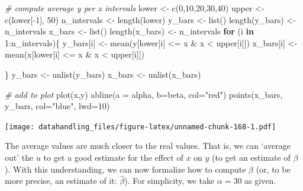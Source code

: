 \documentclass[
  12pt,
]{style/krantz}
\newenvironment{Shaded}{\begin{snugshade}}{\end{snugshade}}
\newcommand{\AttributeTok}[1]{\textcolor[rgb]{0.77,0.63,0.00}{#1}}
\newcommand{\CommentTok}[1]{\textcolor[rgb]{0.56,0.35,0.01}{\textit{#1}}}
\newcommand{\ControlFlowTok}[1]{\textcolor[rgb]{0.13,0.29,0.53}{\textbf{#1}}}
\newcommand{\DecValTok}[1]{\textcolor[rgb]{0.00,0.00,0.81}{#1}}
\newcommand{\FunctionTok}[1]{\textcolor[rgb]{0.00,0.00,0.00}{#1}}
\newcommand{\NormalTok}[1]{#1}
\newcommand{\OtherTok}[1]{\textcolor[rgb]{0.56,0.35,0.01}{#1}}
\newcommand{\SpecialCharTok}[1]{\textcolor[rgb]{0.00,0.00,0.00}{#1}}
\newcommand{\StringTok}[1]{\textcolor[rgb]{0.31,0.60,0.02}{#1}}
\begin{document}
\begin{Shaded}
\begin{Highlighting}[]
\CommentTok{\# compute average y per x intervals}
\NormalTok{lower }\OtherTok{\textless{}{-}} \FunctionTok{c}\NormalTok{(}\DecValTok{0}\NormalTok{,}\DecValTok{10}\NormalTok{,}\DecValTok{20}\NormalTok{,}\DecValTok{30}\NormalTok{,}\DecValTok{40}\NormalTok{)}
\NormalTok{upper }\OtherTok{\textless{}{-}} \FunctionTok{c}\NormalTok{(lower[}\SpecialCharTok{{-}}\DecValTok{1}\NormalTok{], }\DecValTok{50}\NormalTok{)}
\NormalTok{n\_intervals }\OtherTok{\textless{}{-}} \FunctionTok{length}\NormalTok{(lower)}
\NormalTok{y\_bars }\OtherTok{\textless{}{-}} \FunctionTok{list}\NormalTok{()}
\FunctionTok{length}\NormalTok{(y\_bars) }\OtherTok{\textless{}{-}}\NormalTok{ n\_intervals}
\NormalTok{x\_bars }\OtherTok{\textless{}{-}} \FunctionTok{list}\NormalTok{()}
\FunctionTok{length}\NormalTok{(x\_bars) }\OtherTok{\textless{}{-}}\NormalTok{ n\_intervals}
\ControlFlowTok{for}\NormalTok{ (i }\ControlFlowTok{in} \DecValTok{1}\SpecialCharTok{:}\NormalTok{n\_intervals)\{}
\NormalTok{  y\_bars[i] }\OtherTok{\textless{}{-}} \FunctionTok{mean}\NormalTok{(y[lower[i] }\SpecialCharTok{\textless{}=}\NormalTok{ x }\SpecialCharTok{\&}\NormalTok{ x }\SpecialCharTok{\textless{}}\NormalTok{ upper[i]])}
\NormalTok{  x\_bars[i] }\OtherTok{\textless{}{-}} \FunctionTok{mean}\NormalTok{(x[lower[i] }\SpecialCharTok{\textless{}=}\NormalTok{ x }\SpecialCharTok{\&}\NormalTok{ x }\SpecialCharTok{\textless{}}\NormalTok{ upper[i]])}

\NormalTok{\}}
\NormalTok{y\_bars }\OtherTok{\textless{}{-}} \FunctionTok{unlist}\NormalTok{(y\_bars)}
\NormalTok{x\_bars }\OtherTok{\textless{}{-}} \FunctionTok{unlist}\NormalTok{(x\_bars)}

\CommentTok{\# add to plot}
\FunctionTok{plot}\NormalTok{(x,y)}
\FunctionTok{abline}\NormalTok{(}\AttributeTok{a =}\NormalTok{ alpha, }\AttributeTok{b=}\NormalTok{beta, }\AttributeTok{col=}\StringTok{"red"}\NormalTok{)}
\FunctionTok{points}\NormalTok{(x\_bars, y\_bars, }\AttributeTok{col=}\StringTok{"blue"}\NormalTok{, }\AttributeTok{lwd=}\DecValTok{10}\NormalTok{)}
\end{Highlighting}
\end{Shaded}

\texttt{[image: datahandling\_files/figure-latex/unnamed-chunk-168-1.pdf]}

The average values are much closer to the real values. That is, we can `average out' the \(u\) to get a good estimate for the effect of \(x\) on \(y\) (to get an estimate of \(\beta\)). With this understanding, we can now formalize how to compute \(\beta\) (or, to be more precise, an estimate of it: \(\hat{\beta}\)). For simplicity, we take \(\alpha=30\) as given.
\end{document}
